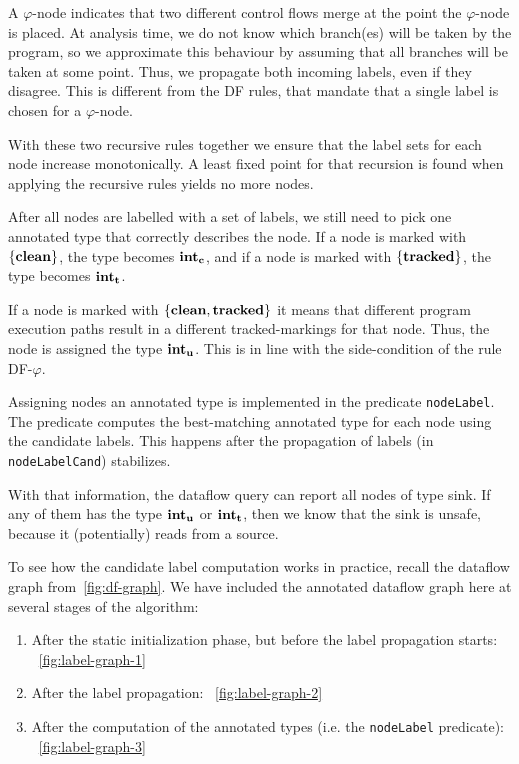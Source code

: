 A $\varphi$-node indicates that two different control flows merge at the point
the $\varphi$-node is placed.
At analysis time, we do not know which branch(es) will be taken by the program,
so we approximate this behaviour by assuming that all branches will be taken at some point.
Thus, we propagate both incoming labels, even if they disagree.
This is different from the DF rules, that mandate that a single label is chosen
for a $\varphi$-node.

With these two recursive rules together we ensure that the label sets for each node
increase monotonically.
A least fixed point for that recursion is found when applying the recursive rules yields
no more nodes.

After all nodes are labelled with a set of labels, we still need to pick one annotated type
that correctly describes the node.
If a node is marked with $\{\textbf{clean}\}$, the type becomes $\textbf{int}_\textbf{c}$,
and if a node is marked with $\{\textbf{tracked}\}$, the type becomes $\textbf{int}_\textbf{t}$.

If a node is marked with $\{\textbf{clean}, \textbf{tracked}\}$ it means that different
program execution paths result in a different tracked-markings for that node.
Thus, the node is assigned the type $\textbf{int}_\textbf{u}$.
This is in line with the side-condition of the rule \textsc{DF-$\varphi$}.

Assigning nodes an annotated type is implemented in the predicate \texttt{nodeLabel}.
The predicate computes the best-matching annotated type for each node using the candidate labels.
This happens after the propagation of labels (in \texttt{nodeLabelCand}) stabilizes.

With that information, the dataflow query can report all nodes of type sink.
If any of them has the type $\textbf{int}_\textbf{u}$ or $\textbf{int}_\textbf{t}$, then we know that the sink
is unsafe, because it (potentially) reads from a source.

To see how the candidate label computation works in practice, recall the dataflow graph
from~\autoref{fig:df-graph}.
We have included the annotated dataflow graph here at several stages of the algorithm:
\begin{enumerate}
    \item After the static initialization phase, but before the label propagation starts:
     ~\autoref{fig:label-graph-1}
    \item After the label propagation: ~\autoref{fig:label-graph-2}
    \item After the computation of the annotated types (i.e. the \texttt{nodeLabel} predicate):
     ~\autoref{fig:label-graph-3}
\end{enumerate}

